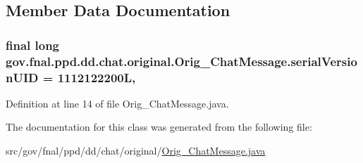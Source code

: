 \subsection{Member Data Documentation}
\hypertarget{classgov_1_1fnal_1_1ppd_1_1dd_1_1chat_1_1original_1_1Orig__ChatMessage_a4bcf6ea6cc0667a564c60e207bcc9aba}{
\subsubsection[{serial\-Version\-U\-I\-D}]{\setlength{\rightskip}{0pt plus 5cm}final long gov.\-fnal.\-ppd.\-dd.\-chat.\-original.\-Orig\-\_\-\-Chat\-Message.\-serial\-Version\-U\-I\-D = 1112122200\-L\hspace{0.3cm}{\ttfamily [static]}, {\ttfamily [protected]}}}\label{classgov_1_1fnal_1_1ppd_1_1dd_1_1chat_1_1original_1_1Orig__ChatMessage_a4bcf6ea6cc0667a564c60e207bcc9aba}


Definition at line 14 of file Orig\-\_\-\-Chat\-Message.\-java.



The documentation for this class was generated from the following file\-:\begin{DoxyCompactItemize}
\item 
src/gov/fnal/ppd/dd/chat/original/\hyperlink{Orig__ChatMessage_8java}{Orig\-\_\-\-Chat\-Message.\-java}\end{DoxyCompactItemize}
